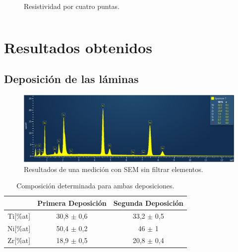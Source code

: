 \documentclass[11pt]{beamer}
\begin{document}
\begin{frame}
\begin{columns}
\begin{column}{.49\textwidth}
\begin{figure}[H]
						\caption*{Resistividad por cuatro puntas.}
					\end{figure}
				\end{column}
			\end{columns}
		\end{frame}
	
\section{Resultados obtenidos}
	\subsection{Deposición de las láminas}
		\begin{frame}
			\begin{figure}
				\includegraphics[scale=0.25]{img/SEMAllElements.png}
				\caption*{Resultados de una medición con SEM sin filtrar elementos.}
			\end{figure}
			\begin{table}[H]
				\centering
				\begin{tabular}{c|c|c|}
				\cline{2-3}
				\multicolumn{1}{l|}{} & Primera Deposición & Segunda Deposición \\ \hline
				\multicolumn{1}{|c|}{Ti{[}\%at{]}} & 30,8 $\pm$ 0,6 & 33,2 $\pm$ 0,5 \\ \hline
				\multicolumn{1}{|c|}{Ni{[}\%at{]}} & 50,4 $\pm$ 0,2 & 46 $\pm$ 1 \\ \hline
				\multicolumn{1}{|c|}{Zr{[}\%at{]}} & 18,9 $\pm$ 0,5 & 20,8 $\pm$ 0,4 \\ \hline
				\end{tabular}
				\caption*{Composición determinada para ambas deposiciones.}
				\label{compositionAvg}
			\end{table}
		\end{frame}
\end{document}
